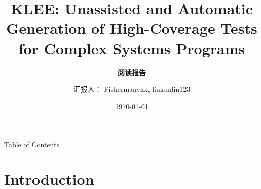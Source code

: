 \documentclass[9pt,aspectratio=43,mathserif,table]{beamer}
\title{\fontsize{14pt}{14pt}KLEE: Unassisted and Automatic Generation of High-Coverage Tests for Complex Systems Programs}
\subtitle{\fontsize{11pt}{14pt}\textbf{阅读报告}}
\author{\fontsize{8pt}{14pt}汇报人： Fishermanykx, liukunlin123}
\institute{\fontsize{8pt}{14pt} Computer Science Institute}
\date{\today}
\begin{document}

\frame{\titlepage}

\section[Table of Contents]{}   %
\begin{frame}{Table of Contents}\small
	\begin{spacing}{0.5}
		\tableofcontents
	\end{spacing}
\end{frame}

\section{Introduction}  %
\end{document}
